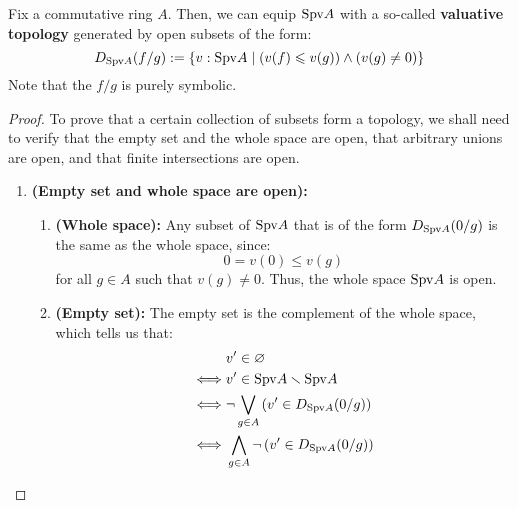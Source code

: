                 \begin{proposition} \label{prop: the_valuative_topology}
                    Fix a commutative ring $A$. Then, we can equip $\Spv A$ with a so-called \textbf{valuative topology} generated by open subsets of the form:
                        $$D_{\Spv A}(f/g) := \{v: \Spv A \mid \left(v(f) \leq v(g)\right) \wedge (v(g) \not = 0)\}$$
                    Note that the  $f/g$ is purely symbolic.
                \end{proposition}
                    \begin{proof}
                        To prove that a certain collection of subsets form a topology, we shall need to verify that the empty set and the whole space are open, that arbitrary unions are open, and that finite intersections are open.
                            \begin{enumerate}
                                \item \textbf{(Empty set and whole space are open):} 
                                    \begin{enumerate}
                                        \item \textbf{(Whole space):} Any subset of $\Spv A$ that is of the form $D_{\Spv A}(0/g)$ is the same as the whole space, since:
                                            $$0 = v(0) \leq v(g)$$
                                        for all $g \in A$ such that $v(g) \not = 0$. Thus, the whole space $\Spv A$ is open. 
                                        \item \textbf{(Empty set):} The empty set is the complement of the whole space, which tells us that:
                                            $$
                                                \begin{aligned}
                                                    & v' \in \varnothing 
                                                    \\
                                                    \iff & v' \in \Spv A \setminus \Spv A
                                                    \\
                                                    \iff & \neg \bigvee_{g \in A} \left(v' \in D_{\Spv A}(0/g)\right)
                                                    \\
                                                    \iff & \bigwedge_{g \in A} \neg \left(v' \in D_{\Spv A}(0/g)\right)
                                                    \\

\end{aligned}$$
\end{enumerate}
\end{enumerate}
\end{proof}
